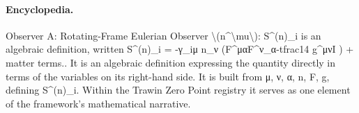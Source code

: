 \paragraph{Encyclopedia.}
Observer A: Rotating-Frame Eulerian Observer \textbackslash{}(n\textasciicircum{}\textbackslash{}mu\textbackslash{}): S\textasciicircum{}(n)\_i is an algebraic definition, written S\textasciicircum{}(n)\_i = -γ\_iμ n\_ν (F\textasciicircum{}μαF\textasciicircum{}ν\_α-tfrac14 g\textasciicircum{}μνI ) + matter terms.. It is an algebraic definition expressing the quantity directly in terms of the variables on its right-hand side. It is built from μ, ν, α, n, F, g, defining S\textasciicircum{}(n)\_i. Within the Trawin Zero Point registry it serves as one element of the framework's mathematical narrative.
